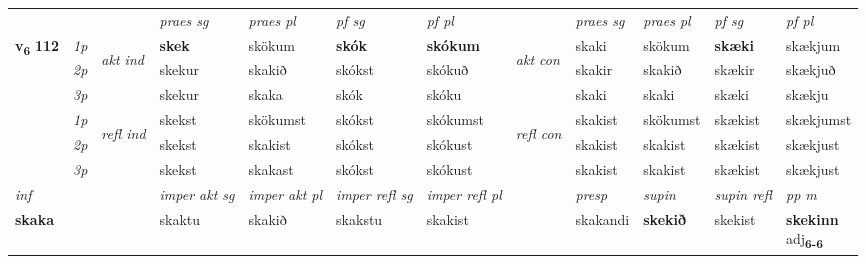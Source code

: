 \begin{longtable}[l]{X>{\footnotesize\itshape}llXXXXlXXXX}
\midrule

 & &   & \textit{praes sg}  & \textit{praes pl}    & \textit{ pf sg} & \textit{pf pl} & & \textit{praes sg}  & \textit{praes pl}    & \textit{pf sg} & \textit{pf pl }  \\ \cmidrule{4-7} \cmidrule{9-12}
 \multirow{2}{*}{{{\textbf{v{\textsubscript{6}}} \Large{\textbf{112}}}}}  & 1p & \multirow{3}{*}{\begin{turn}{90}\textit{akt ind}\end{turn}} & \textbf{skek} & skökum & \textbf{skók} & \textbf{skókum} & \multirow{3}{*}{\begin{turn}{90}\textit{akt con}\end{turn}} &skaki & skökum & \textbf{skæki} & skækjum\\*
 & 2p &  &  skekur  & skakið & skókst & skókuð & & skakir & skakið & skækir & skækjuð \\*
 & 3p &  & skekur & skaka & skók & skóku & & skaki & skaki& skæki & skækju \\*
\cmidrule{4-7} \cmidrule{9-12}
 & 1p & \multirow{3}{*}{\begin{turn}{90}\textit{refl ind}\end{turn}}  & skekst & skökumst & skókst & skókumst & \multirow{3}{*}{\begin{turn}{90}\textit{refl con}\end{turn}}  &skakist & skökumst & skækist & skækjumst \\*
 & 2p &  & skekst & skakist & skókst & skókust & &skakist & skakist & skækist & skækjust \\*
 & 3p  & & skekst & skakast & skókst & skókust & & skakist & skakist& skækist & skækjust \\*
\cmidrule{4-7} \cmidrule{9-12}

   {\textit{inf}} & &  & \textit{imper akt sg} & \textit{imper akt pl} & \textit{imper refl sg} & \textit{imper refl pl} && \textit{presp} & \textit{supin} & \textit{supin refl} & \textit{pp m} \\*
  {\textbf{skaka}} & && skaktu  & skakið & skakstu & skakist && skakandi &  \textbf{skekið} & skekist & \specialcell{\textbf{skekinn} \\ adj\textbf{\textsubscript{6-6}}} \\*

\midrule


\end{longtable}
